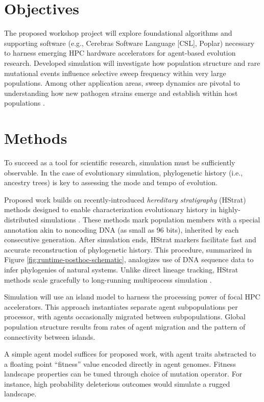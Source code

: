 \section{Objectives}

The proposed workshop project will explore foundational algorithms and supporting software (e.g., Cerebras Software Language [CSL], Poplar) necessary to harness emerging HPC hardware accelerators for agent-based evolution research.
Developed simulation will investigate how population structure and rare mutational events influence selective sweep frequency within very large populations.
Among other application areas, sweep dynamics are pivotal to understanding how new pathogen strains emerge and establish within host populations \cite{markov2023evolution}.

\section{Methods}

To succeed as a tool for scientific research, simulation must be sufficiently observable.
In the case of evolutionary simulation, phylogenetic history (i.e., ancestry trees) is key to assessing the mode and tempo of evolution.



Proposed work builds on recently-introduced \textit{hereditary stratigraphy} (HStrat) methods designed to enable characterization evolutionary history in highly-distributed simulations \cite{moreno2022hstrat}.
These methods mark population members with a special annotation akin to noncoding DNA (as small as 96 bits), inherited by each consecutive generation.
After simulation ends, HStrat markers facilitate fast and accurate reconstruction of phylogenetic history.
This procedure, summarized in Figure \ref{fig:runtime-posthoc-schematic}, analogizes use of DNA sequence data to infer phylogenies of natural systems.
Unlike direct lineage tracking, HStrat methods scale gracefully to long-running multiprocess simulation \cite{moreno2024analysis}.

Simulation will use an island model to harness the processing power of focal HPC accelerators.
This approach instantiates separate agent subpopulations per processor, with agents occasionally migrated between subpopulations.
Global population structure results from rates of agent migration and the pattern of connectivity between islands.

A simple agent model suffices for proposed work, with agent traits abstracted to a floating point ``fitness'' value encoded directly in agent genomes.
Fitness landscape properties can be tuned through choice of mutation operator.
For instance, high probability deleterious outcomes would simulate a rugged landscape.

